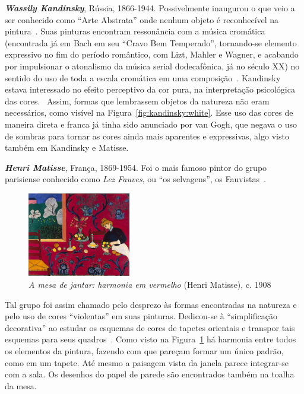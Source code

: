 \textbf{\emph{Wassily Kandinsky}}, Rússia, 1866-1944. Possivelmente
inaugurou o que veio a ser conhecido como ``Arte Abstrata'' onde
nenhum objeto é reconhecível na pintura~\cite{duchting}. Suas pinturas
encontram ressonância com a música cromática (encontrada já em Bach em
seu ``Cravo Bem Temperado'', tornando-se elemento expressivo no fim do
período romântico, com Lizt, Mahler e Wagner, e acabando por
impulsionar o atonalismo da música serial dodecafônica, já no século
XX) no sentido do uso de toda a escala cromática em uma
composição~\cite{gombrich}. Kandinsky estava interessado no efeito
perceptivo da cor pura, na interpretação psicológica das
cores.~\cite{ione} Assim, formas que lembrassem objetos da natureza
não eram necessários, como visível na
Figura~\ref{fig:kandinsky:white}. Esse uso das cores de maneira direta
e franca já tinha sido anunciado por van Gogh, que negava o uso de
sombras para tornar as cores ainda mais aparentes e expressivas, algo
visto também em Kandinsky e Matisse.



\textbf{\emph{Henri Matisse}}, França, 1869-1954. Foi o mais famoso
pintor do grupo parisiense conhecido como \textit{Lez Fauves}, ou ``os
selvagens'', os Fauvistas~\cite{elderfield,freeman}. 

\begin{figure}
  \begin{center}
    \includegraphics[width=0.4\textwidth]{figs/matisse_red.png}
  \end{center}
  \caption{\emph{A mesa de jantar: harmonia em vermelho} (Henri Matisse), c. 1908}
  \label{fig:matisse:red}
\end{figure}

Tal grupo foi assim chamado pelo desprezo às formas encontradas na
natureza e pelo uso de cores ``violentas'' em suas
pinturas. Dedicou-se à ``simplificação decorativa'' ao estudar os
esquemas de cores de tapetes orientais e transpor tais esquemas para
seus quadros~\cite{gombrich}. Como visto na
Figura~\ref{fig:matisse:red} há harmonia entre todos os elementos da
pintura, fazendo com que pareçam formar um único padrão, como em um
tapete. Até mesmo a paisagem vista da janela parece integrar-se com a
sala. Os desenhos do papel de parede são encontrados também na toalha
da mesa. 

